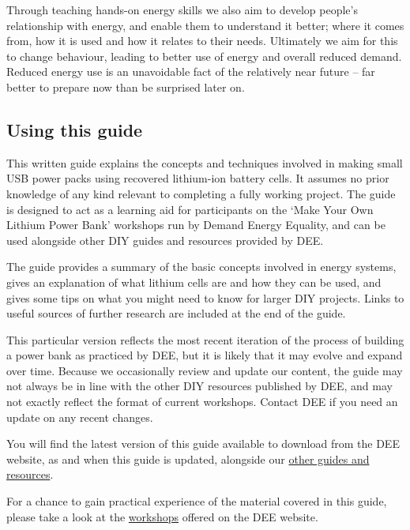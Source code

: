 \documentclass{article}
\theoremstyle{definition}
\theoremstyle{definition}
\theoremstyle{remark}
\begin{document}
    Through teaching hands-on energy skills we also aim to develop people’s relationship with energy, and enable them to understand it better; where it comes from, how it is used and how it relates to their needs. Ultimately we aim for this to change behaviour, leading to better use of energy and overall reduced demand. Reduced energy use is an unavoidable fact of the relatively near future – far better to prepare now than be surprised later on.
  
  
  \subsection{Using this guide} %
  \label{sub:using_this_guide}

    This written guide explains the concepts and techniques involved in making small USB power packs using recovered lithium-ion battery cells. It assumes no prior knowledge of any kind relevant to completing a fully working project. The guide is designed to act as a learning aid for participants on the ‘Make Your Own Lithium Power Bank’ workshops run by Demand Energy Equality, and can be used alongside other DIY guides and resources provided by DEE. 
    
    The guide provides a summary of the basic concepts involved in energy systems, gives an explanation of what lithium cells are and how they can be used, and gives some tips on what you might need to know for larger DIY projects. Links to useful sources of further research are included at the end of the guide.
    
    This particular version reflects the most recent iteration of the process of building a power bank as practiced by DEE, but it is likely that it may evolve and expand over time. Because we occasionally review and update our content, the guide may not always be in line with the other DIY resources published by DEE, and may not exactly reflect the format of current workshops. Contact DEE if you need an update on any recent changes. 
    
    You will find the latest version of this guide available to download from the DEE website, as and when this guide is updated, alongside our \href{https://www.demandenergyequality.org/resources/}{other guides and resources}.
    
    For a chance to gain practical experience of the material covered in this guide, please take a look at the \href{https://www.demandenergyequality.org/our-workshops/}{workshops} offered on the DEE website.
    
\end{document}
